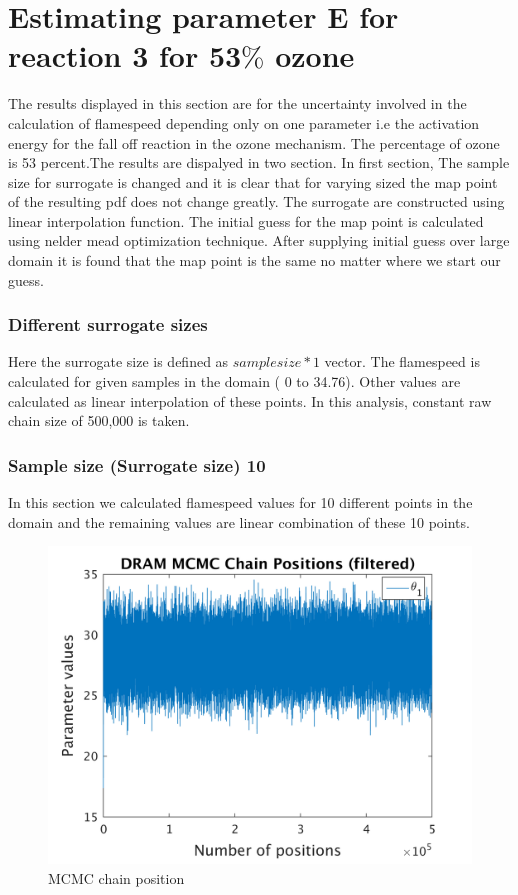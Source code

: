 \section{Estimating parameter E for reaction 3 for 53$\%$ ozone }

The results displayed in this section are for the uncertainty involved in the calculation of flamespeed depending only on one parameter i.e the activation energy for the fall off reaction in the ozone mechanism. The percentage of ozone is 53 percent.The results are dispalyed in two section. In first section, The sample size for surrogate is changed and it is clear that for varying sized the map point of the resulting pdf does not change greatly. The surrogate are constructed using linear interpolation function. The initial guess for the map point is calculated using nelder mead optimization technique. After supplying initial guess over large domain it is found that the map point is the same no matter where we start our guess. 
\bigskip

\subsubsection{Different surrogate sizes }

\noindent Here the surrogate size is defined as $sample size*1$ vector. The flamespeed is calculated for given samples in the domain ( 0 to 34.76). Other values are calculated as linear interpolation of these points. In this analysis, constant raw chain size of 500,000 is taken. 
\subsubsection{Sample size (Surrogate size) 10 }
In this section we calculated flamespeed values for 10 different points in the domain and the remaining values are linear combination of these 10 points.  
\begin{figure}[H]
  
  \centering
   \includegraphics[scale=0.75]{53_results/output_10/simple_ip_chain_pos_filt}
   \caption{MCMC chain position }
\end{figure}


